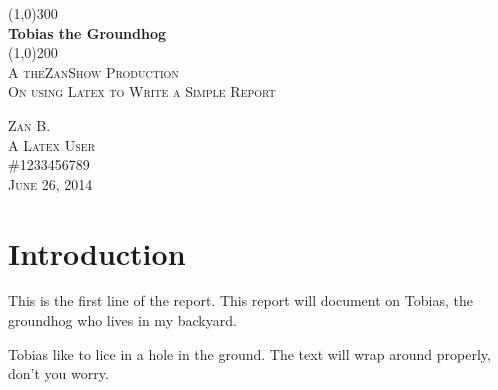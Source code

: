 \documentclass{article}
\begin{document}
\begin{titlepage}
	\begin{center}
	\line(1,0){300} \\
	[0.25in]
	\huge{\bfseries Tobias the Groundhog}\\
	[2mm]
	\line(1,0){200} \\
	[1.5cm]
	\textsc {\LARGE A theZanShow Production}\\
	[0.75cm]
	\textsc{\Large On using Latex to Write a Simple Report} \\
	[9cm]
	\end{center}
	\begin{flushright}
	\textsc{\large Zan B. \\
	A Latex User \\
	\#1233456789\\
	June 26, 2014\\}
	\end{flushright}	
\end{titlepage}

\section{Introduction}\label{sec:intro}
This is the first line of the report. This report will document on Tobias, the groundhog who lives in my backyard.

Tobias like to lice in a hole in the ground. The text will wrap around properly, don't you worry.
\end{document}
